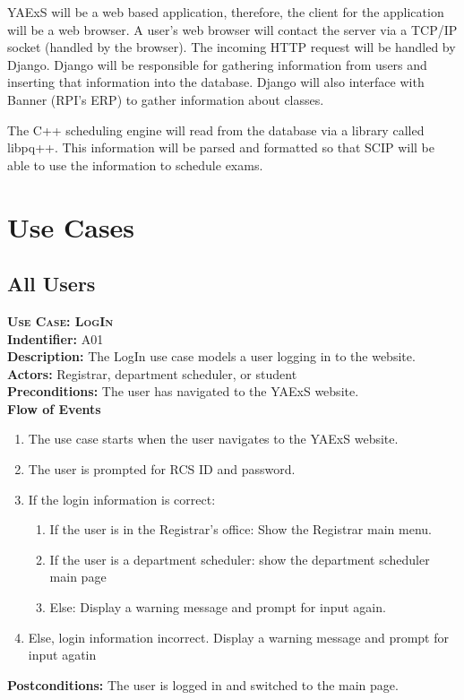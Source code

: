 \documentclass[11pt]{article}
\newcounter{id}
\newenvironment{usecase}{%
	\def\title##1{ {\large \bfseries  \scshape {Use Case:} ##1} \\ }
 	\def\id##1{{\bf Indentifier:} ##1\\}
	\def\des##1{ {\bf Description:} ##1\\}
	\def\actors##1{ {\bf Actors:} ##1\\}
    	\def\pre##1{ {\bf Preconditions:} ##1 \\} %
    	\def\flow##1{ {\bf Flow of Events} ##1}%
    	\newenvironment{ucenum}{%
        	\begin{enumerate}[nolistsep]\small}%
        	{\end{enumerate}}
	\def\post##1{ {\bf Postconditions:} ##1 \\}
}{\vspace{.05in}}
\begin{document}
YAExS will be a web based application, therefore, the client for the application will be a web browser.  A user's web browser will contact the server via a TCP/IP socket (handled by the browser).  The incoming HTTP request will be handled by Django.  Django will be responsible for gathering information from users and inserting that information into the database.  Django will also interface with Banner (RPI's ERP) to gather information about classes.

The C++ scheduling engine will read from the database via a library called libpq++.  This information will be parsed and formatted so that SCIP will be able to use the information to schedule exams.


\section{Use Cases} %

\subsection{All Users}
\begin{usecase}
  \title{LogIn}
  \id{A01}
  \des{The LogIn use case models a user logging in to the website.}
  \actors{Registrar, department scheduler, or student}
  \pre{The user has navigated to the YAExS website.}
  \flow{}
  \begin{ucenum}
  \item The use case starts when the user navigates to the YAExS website.
  \item The user is prompted for RCS ID and password.
  \item If the login information is correct:
    \begin{ucenum}
    \item If the user is in the Registrar's office: Show the Registrar main menu.
    \item If the user is a department scheduler: show the department scheduler main page
    \item Else: Display a warning message and prompt for input again.
    \end{ucenum}
  \item Else, login information incorrect. Display a warning message and prompt for input agatin
  \end{ucenum}
  \post{The user is logged in and switched to the main page.}
\end{usecase}
\end{document}
